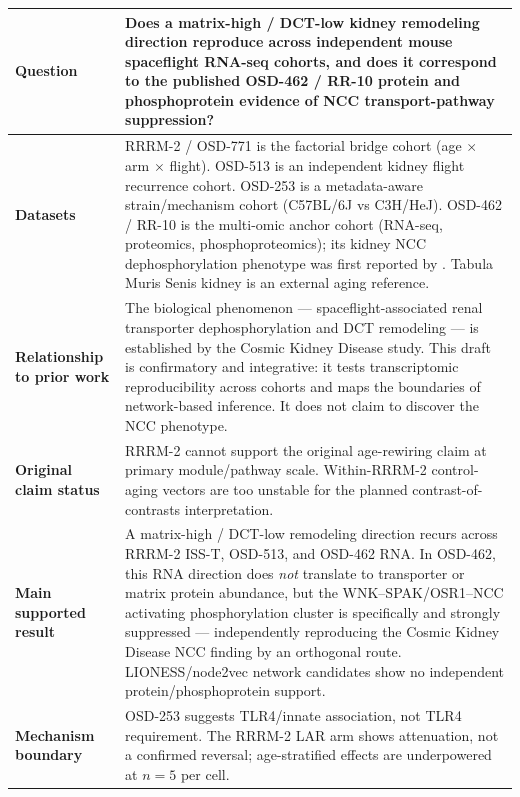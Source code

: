 \documentclass[11pt]{article}
\begin{document}
\vspace{0.6em}
\small
\begin{tabularx}{\textwidth}{>{\bfseries}p{}X}
\toprule
Question & Does a matrix-high / DCT-low kidney remodeling direction reproduce across independent mouse spaceflight RNA-seq cohorts, and does it correspond to the published OSD-462 / RR-10 protein and phosphoprotein evidence of NCC transport-pathway suppression? \\
\midrule
Datasets & RRRM-2 / OSD-771 is the factorial bridge cohort (age $\times$ arm $\times$ flight). OSD-513 is an independent kidney flight recurrence cohort. OSD-253 is a metadata-aware strain/mechanism cohort (C57BL/6J vs C3H/HeJ). OSD-462 / RR-10 is the multi-omic anchor cohort (RNA-seq, proteomics, phosphoproteomics); its kidney NCC dephosphorylation phenotype was first reported by \citet{siew2024cosmic}. Tabula Muris Senis kidney is an external aging reference. \\
\midrule
Relationship to prior work & The biological phenomenon --- spaceflight-associated renal transporter dephosphorylation and DCT remodeling --- is established by the Cosmic Kidney Disease study. This draft is confirmatory and integrative: it tests transcriptomic reproducibility across cohorts and maps the boundaries of network-based inference. It does not claim to discover the NCC phenotype. \\
\midrule
Original claim status & RRRM-2 cannot support the original age-rewiring claim at primary module/pathway scale. Within-RRRM-2 control-aging vectors are too unstable for the planned contrast-of-contrasts interpretation. \\
\midrule
Main supported result & A matrix-high / DCT-low remodeling direction recurs across RRRM-2 ISS-T, OSD-513, and OSD-462 RNA. In OSD-462, this RNA direction does \emph{not} translate to transporter or matrix protein abundance, but the WNK--SPAK/OSR1--NCC activating phosphorylation cluster is specifically and strongly suppressed --- independently reproducing the Cosmic Kidney Disease NCC finding by an orthogonal route. LIONESS/node2vec network candidates show no independent protein/phosphoprotein support. \\
\midrule
Mechanism boundary & OSD-253 suggests TLR4/innate association, not TLR4 requirement. The RRRM-2 LAR arm shows attenuation, not a confirmed reversal; age-stratified effects are underpowered at $n=5$ per cell. \\
\bottomrule
\end{tabularx}
\normalsize
\end{document}
